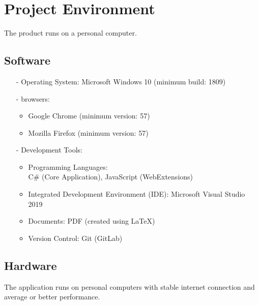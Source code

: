 \chapter{Project Environment}
\label{ch:environment}

The product runs on a personal computer.

\section{Software}
\begin{itemize}
\item[-] Operating System: Microsoft Windows 10 (minimum build: 1809)
\item[-] \glspl{browser}:
	\begin{itemize}
	\item Google Chrome (minimum version: 57)
	\item Mozilla Firefox (minimum version: 57)
	\end{itemize}

\item[-] Development Tools:
	\begin{itemize}
	\item Programming Languages: \\C\# (Core Application), JavaScript (WebExtensions)
	\item Integrated Development Environment (IDE): Microsoft Visual Studio 2019
	\item Documents: PDF (created using LaTeX)
	\item Version Control: Git (GitLab)
	\end{itemize}
\end{itemize}
\section{Hardware}

The application runs on personal computers with stable internet connection and average or better performance.
